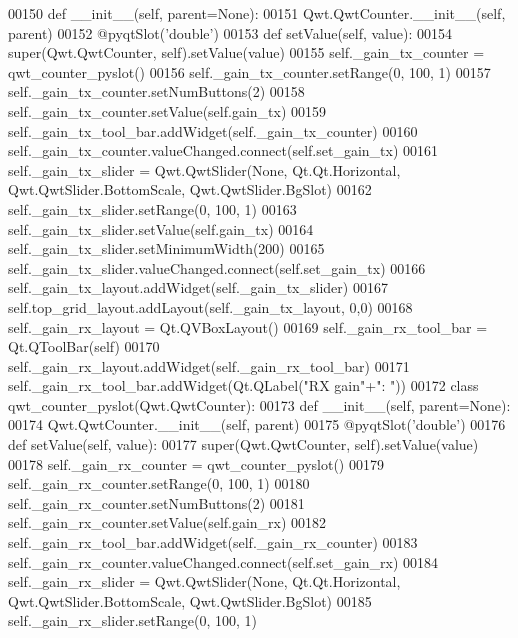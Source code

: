 \begin{DoxyCode}
00150             \textcolor{keyword}{def }__init__(self, parent=None):
00151                 Qwt.QwtCounter.\_\_init\_\_(self, parent)
00152             @pyqtSlot(\textcolor{stringliteral}{'double'})
00153             \textcolor{keyword}{def }setValue(self, value):
00154                 super(Qwt.QwtCounter, self).setValue(value)
00155         self._gain_tx_counter = qwt\_counter\_pyslot()
00156         self.\_gain\_tx\_counter.setRange(0, 100, 1)
00157         self.\_gain\_tx\_counter.setNumButtons(2)
00158         self.\_gain\_tx\_counter.setValue(self.gain_tx)
00159         self.\_gain\_tx\_tool\_bar.addWidget(self._gain_tx_counter)
00160         self.\_gain\_tx\_counter.valueChanged.connect(self.set_gain_tx)
00161         self._gain_tx_slider = Qwt.QwtSlider(\textcolor{keywordtype}{None}, Qt.Qt.Horizontal, Qwt.QwtSlider.BottomScale, 
      Qwt.QwtSlider.BgSlot)
00162         self.\_gain\_tx\_slider.setRange(0, 100, 1)
00163         self.\_gain\_tx\_slider.setValue(self.gain_tx)
00164         self.\_gain\_tx\_slider.setMinimumWidth(200)
00165         self.\_gain\_tx\_slider.valueChanged.connect(self.set_gain_tx)
00166         self.\_gain\_tx\_layout.addWidget(self._gain_tx_slider)
00167         self.top\_grid\_layout.addLayout(self._gain_tx_layout, 0,0)
00168         self._gain_rx_layout = Qt.QVBoxLayout()
00169         self._gain_rx_tool_bar = Qt.QToolBar(self)
00170         self.\_gain\_rx\_layout.addWidget(self._gain_rx_tool_bar)
00171         self.\_gain\_rx\_tool\_bar.addWidget(Qt.QLabel(\textcolor{stringliteral}{"RX gain"}+\textcolor{stringliteral}{": "}))
00172         \textcolor{keyword}{class }qwt\_counter\_pyslot(Qwt.QwtCounter):
00173             \textcolor{keyword}{def }__init__(self, parent=None):
00174                 Qwt.QwtCounter.\_\_init\_\_(self, parent)
00175             @pyqtSlot(\textcolor{stringliteral}{'double'})
00176             \textcolor{keyword}{def }setValue(self, value):
00177                 super(Qwt.QwtCounter, self).setValue(value)
00178         self._gain_rx_counter = qwt\_counter\_pyslot()
00179         self.\_gain\_rx\_counter.setRange(0, 100, 1)
00180         self.\_gain\_rx\_counter.setNumButtons(2)
00181         self.\_gain\_rx\_counter.setValue(self.gain_rx)
00182         self.\_gain\_rx\_tool\_bar.addWidget(self._gain_rx_counter)
00183         self.\_gain\_rx\_counter.valueChanged.connect(self.set_gain_rx)
00184         self._gain_rx_slider = Qwt.QwtSlider(\textcolor{keywordtype}{None}, Qt.Qt.Horizontal, Qwt.QwtSlider.BottomScale, 
      Qwt.QwtSlider.BgSlot)
00185         self.\_gain\_rx\_slider.setRange(0, 100, 1)

\end{DoxyCode}
